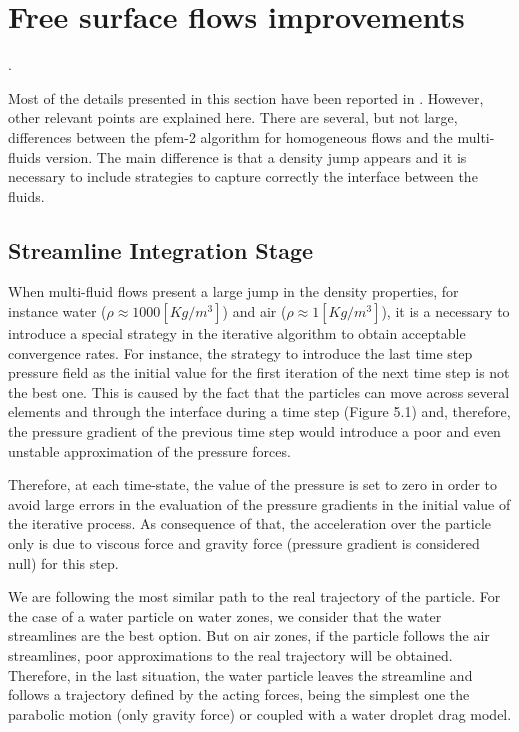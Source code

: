 \documentclass[a4paper,conference]{IEEEtran}
\begin{document}
\section{Free surface flows improvements}. 

Most of the details presented in this section have been reported in \cite{Idelsohn13c}. However, other relevant points are explained here. There are several, but not large, differences between the pfem-2 algorithm for homogeneous flows and the multi-fluids version. The main difference is that a density jump appears and it is necessary to include strategies to capture correctly the interface between the fluids.
	
	\subsection{Streamline Integration Stage}

    When multi-fluid flows present a large jump in the density properties, for instance water ($\rho \approx 1000 [Kg/m^3]$) and air ($\rho \approx 1 [Kg/m^3]$), it is a necessary to introduce a special strategy in the iterative algorithm to obtain acceptable convergence rates. For instance, the strategy to introduce the last time step pressure field as the initial value for the first iteration of the next time step is not the best one. This is caused by the fact that the particles can move across several elements and through the interface during a time step (Figure 5.1) and, therefore, the pressure gradient of the previous time step would introduce a poor and even unstable approximation of the pressure forces.
       
    Therefore, at each time-state, the value of the pressure is set to zero in order to avoid large errors in the evaluation of the pressure gradients in the initial value of the iterative process. As consequence of that, the acceleration over the particle only is due to viscous force and gravity force (pressure gradient is considered null) for this step.
       
    We are following the most similar path to the real trajectory of the particle. For the case of a water particle on water zones, we consider that the water streamlines are the best option. But on air zones, if the particle follows the air streamlines, poor approximations to the real trajectory will be obtained. Therefore, in the last situation, the water particle leaves the streamline and follows a trajectory defined by the acting forces, being the simplest one the parabolic motion (only gravity force) or coupled with a water droplet drag model. 
\end{document}

